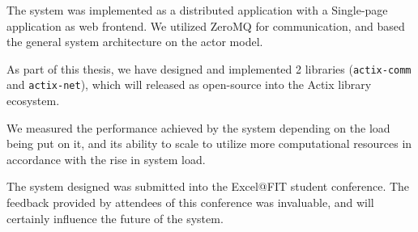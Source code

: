 The system was implemented as a distributed application with a Single-page application as web frontend. We utilized
ZeroMQ for communication, and based the general system architecture on the actor model.

As part of this thesis, we have designed and implemented 2 libraries (\verb|actix-comm| and \verb|actix-net|), which
will released as open-source into the Actix library ecosystem.

We measured the performance achieved by the system depending on the load being put on it, and its ability to scale to
utilize more computational resources in accordance with the rise in system load.

The system designed was submitted into the Excel@FIT student conference. The feedback provided by attendees of this
conference was invaluable, and will certainly influence the future of the system.

